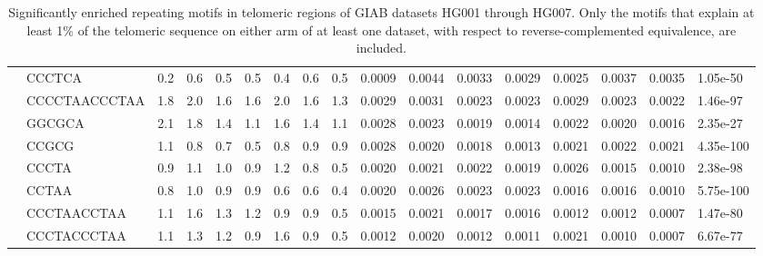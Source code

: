 \begin{landscape}
\begin{samepage}
\begin{table}[h!]
\begin{tabular}{lllllllllllllllll}
\textbf{}    &         CCCTCA &  0.2  &  0.6  &  0.5  &  0.5  &  0.4  &  0.6  &  0.5  &  0.0009 &  0.0044 &  0.0033 &  0.0029 &  0.0025 &  0.0037 &  0.0035 &   1.05e-50 \\
\textbf{}    &  CCCCTAACCCTAA &  1.8  &  2.0  &  1.6  &  1.6  &  2.0  &  1.6  &  1.3  &  0.0029 &  0.0031 &  0.0023 &  0.0023 &  0.0029 &  0.0023 &  0.0022 &   1.46e-97 \\
\textbf{}    &         GGCGCA &  2.1  &  1.8  &  1.4  &  1.1  &  1.6  &  1.4  &  1.1  &  0.0028 &  0.0023 &  0.0019 &  0.0014 &  0.0022 &  0.0020 &  0.0016 &   2.35e-27 \\
\textbf{}    &          CCGCG &  1.1  &  0.8  &  0.7  &  0.5  &  0.8  &  0.9  &  0.9  &  0.0028 &  0.0020 &  0.0018 &  0.0013 &  0.0021 &  0.0022 &  0.0021 &  4.35e-100 \\
\textbf{}    &          CCCTA &  0.9  &  1.1  &  1.0  &  0.9  &  1.2  &  0.8  &  0.5  &  0.0020 &  0.0021 &  0.0022 &  0.0019 &  0.0026 &  0.0015 &  0.0010 &   2.38e-98 \\
\textbf{}    &          CCTAA &  0.8  &  1.0  &  0.9  &  0.9  &  0.6  &  0.6  &  0.4  &  0.0020 &  0.0026 &  0.0023 &  0.0023 &  0.0016 &  0.0016 &  0.0010 &  5.75e-100 \\
\textbf{}    &    CCCTAACCTAA &  1.1  &  1.6  &  1.3  &  1.2  &  0.9  &  0.9  &  0.5  &  0.0015 &  0.0021 &  0.0017 &  0.0016 &  0.0012 &  0.0012 &  0.0007 &   1.47e-80 \\
\textbf{}    &    CCCTACCCTAA &  1.1  &  1.3  &  1.2  &  0.9  &  1.6  &  0.9  &  0.5  &  0.0012 &  0.0020 &  0.0012 &  0.0011 &  0.0021 &  0.0010 &  0.0007 &   6.67e-77 \\
\hline
\end{tabular}
\caption{
    Significantly enriched repeating motifs in telomeric regions of GIAB datasets HG001 through HG007.
    Only the motifs that explain at least 1\% of the telomeric sequence on either arm of at least one dataset, with respect to reverse-complemented equivalence, are included.
}
\label{tab:repeatfinder}
\end{table}
\end{samepage}
\end{landscape}
